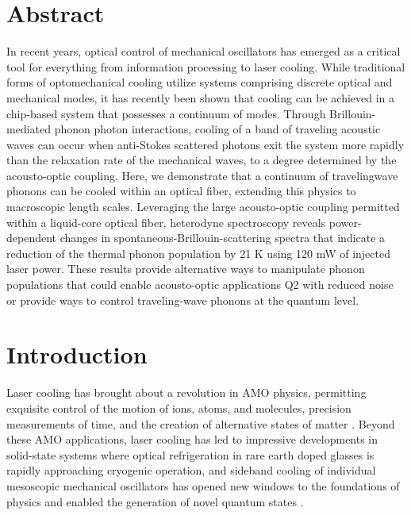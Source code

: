 \section{Abstract}
In recent years, optical control of mechanical oscillators has emerged as a critical tool for everything from information processing to laser cooling. While traditional forms of optomechanical cooling utilize systems comprising discrete optical and mechanical modes, it has recently been shown that cooling can be achieved in a chip-based system that possesses a continuum of modes. Through Brillouin-mediated phonon photon interactions, cooling of a band of traveling acoustic waves can occur when anti-Stokes scattered photons exit the system more rapidly than the relaxation rate of the mechanical waves, to a degree determined by the acousto-optic coupling. Here, we demonstrate that a continuum of travelingwave phonons can be cooled within an optical fiber, extending this physics to macroscopic length scales. Leveraging the large acousto-optic coupling permitted within a liquid-core optical fiber, heterodyne spectroscopy reveals power-dependent changes in spontaneous-Brillouin-scattering spectra that indicate a reduction of the thermal phonon population by 21 K using 120 mW of injected laser power. These results provide alternative ways to manipulate phonon populations that could enable acousto-optic applications Q2 with reduced noise or provide ways to control traveling-wave phonons at the quantum level.

\hfill

\section{Introduction}
Laser cooling has brought about a revolution in \ac{AMO} physics, permitting exquisite control of the motion of ions, atoms, and molecules, precision measurements of time, and the creation of alternative states of matter \citep{hansch1975cooling, ashkin1978trapping, wineland1978radiation, phillips1982laser, anderson1995observation, davis1995bose, ludlow2015optical, epstein1995observation, sheik2007optical}. Beyond these \ac{AMO} applications, laser cooling has led to impressive developments in solid-state systems where optical refrigeration in rare earth doped glasses is rapidly approaching cryogenic operation, and sideband cooling of individual mesoscopic mechanical oscillators has opened new windows to the foundations of physics and enabled the generation of novel quantum states \citep{chan2011laser, marshall2003towards, hong2017hanbury, aspelmeyer2014cavity}.

